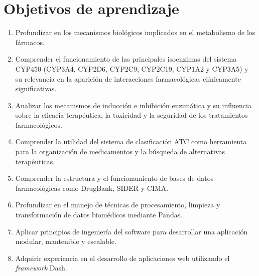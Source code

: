 \section{Objetivos de aprendizaje}
\begin{enumerate}
    \item Profundizar en los mecanismos biológicos implicados en el metabolismo de los fármacos.
    \item Comprender el funcionamiento de las principales isoenzimas del sistema CYP450 (CYP3A4, CYP2D6, CYP2C9, CYP2C19, CYP1A2 y CYP3A5) y su relevancia en la aparición de interacciones farmacológicas clínicamente significativas.
    \item Analizar los mecanismos de inducción e inhibición enzimática y su influencia sobre la eficacia terapéutica, la toxicidad y la seguridad de los tratamientos farmacológicos.
    \item Comprender la utilidad del sistema de clasificación ATC como herramienta para la organización de medicamentos y la búsqueda de alternativas terapéuticas.
    \item Comprender la estructura y el funcionamiento de bases de datos farmacológicas como DrugBank, SIDER y CIMA.
    \item Profundizar en el manejo de técnicas de procesamiento, limpieza y transformación de datos biomédicos mediante Pandas.
    \item Aplicar principios de ingeniería del software para desarrollar una aplicación modular, mantenible y escalable.
    \item Adquirir experiencia en el desarrollo de aplicaciones web utilizando el \textit{framework} Dash.
    
\end{enumerate}






